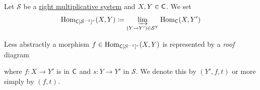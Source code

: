 \documentclass[../../main]{subfiles}
\begin{document}
\begin{definition}\label{def:right-multiplicative-morphism}
  Let \(\mathcal{S}\) be a \hyperref[def:multiplicative-system]{right multiplicative system} and \(X, Y \in \mathsf{C}\).
  We set
  \begin{equation*}
    \operatorname{Hom}_{\mathsf{C}[\mathcal{S}^{-1}]^{r}}(X, Y) \coloneq \varinjlim_{(Y \to Y') \in \mathcal{S}^{Y}} \operatorname{Hom}_{\mathsf{C}}(X, Y')
  \end{equation*}

  Less abstractly a morphism \(f \in \operatorname{Hom}_{\mathsf{C}[\mathcal{S}^{-1}]^{r}}(X, Y)\) is represented by a \textit{roof} diagram
  \begin{center}
  \end{center}
  where \(f: X \to Y'\) is in \(\mathsf{C}\) and \(s: Y \to Y'\) in \(\mathcal{S}\).
  We denote this by \((Y', f, t)\) or more simply by \((f, t)\).
\end{definition}
\end{document}

